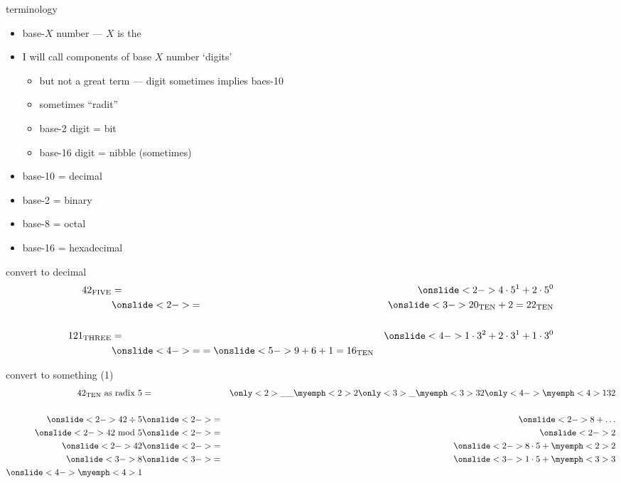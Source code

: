 \begin{frame}{terminology}
    \begin{itemize}
    \item base-$X$ number --- $X$ is the 
    \item I will call components of base $X$ number `digits'
        \begin{itemize}
        \item but not a great term --- digit sometimes implies baes-10
        \item sometimes ``radit''
        \item base-2 digit = bit
        \item base-16 digit = nibble (sometimes)
        \end{itemize}
    \item base-10 = decimal
    \item base-2 = binary
    \item base-8 = octal
    \item base-16 = hexadecimal
    \end{itemize}
\end{frame}

\begin{frame}{convert to decimal}
\begin{eqnarray*}
    42_\text{FIVE} & = & \onslide<2->{4 \cdot 5^1 + 2 \cdot 5^0} \\
                   & \onslide<2->{=} & \onslide<3->{20_\text{TEN} + 2 = 22_\text{TEN}} \\
                   ~\\
    121_\text{THREE} & = & \onslide<4->{1\cdot 3^2 + 2 \cdot 3^1 + 1 \cdot 3^0} \\
                     & \onslide<4->{=} = \onslide<5->{9 + 6 + 1 = 16_\text{TEN}} \\
\end{eqnarray*}
\end{frame}

\begin{frame}{convert to something (1)}
\begin{eqnarray*}
    42_\text{TEN} \text{~as radix 5} &=& \only<2>{\_\_\myemph<2>{2}}\only<3>{\_\myemph<3>{3}2}\only<4->{\myemph<4>{1}32} \\
    ~ \\
    \onslide<2->{42 \div 5} & \onslide<2->{=} & \onslide<2->{8 + \ldots} \\
    \onslide<2->{42 \text{~mod~} 5} & \onslide<2->{=} & \onslide<2->{2} \\
    \onslide<2->{42} & \onslide<2->{=} & \onslide<2->{8 \cdot 5 + \myemph<2>{2}} \\
    \onslide<3->{8} & \onslide<3->{=} & \onslide<3->{1 \cdot 5 + \myemph<3>{3}} \\
    \onslide<4->{\myemph<4>{1}}
\end{eqnarray*}
\end{frame}


